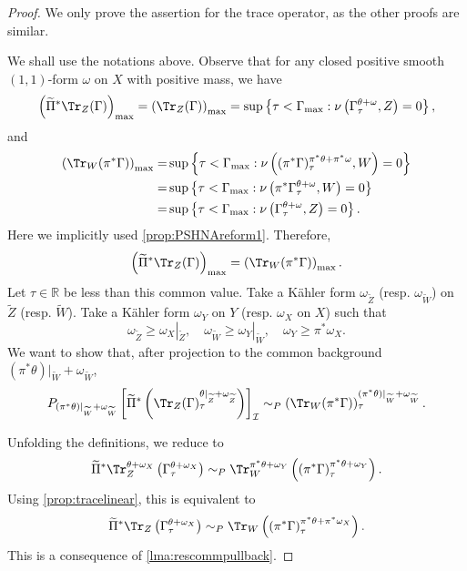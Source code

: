 \begin{proof}
We only prove the assertion for the trace operator, as the other proofs are similar.

We shall use the notations above. Observe that for any closed positive smooth $(1,1)$-form $\omega$ on $X$ with positive mass, we have
\[
\left(\widetilde{\Pi}^* \Tr_Z(\Gamma)\right)_{\max}=\left( \Tr_Z(\Gamma)\right)_{\max}=\sup\left\{ \tau<\Gamma_{\max}: \nu\left(\Gamma^{\theta+\omega}_{\tau},Z\right)=0 \right\},
\]
and
\[
\begin{aligned}
\left(\Tr_W(\pi^*\Gamma)\right)_{\max}=&\sup\left\{ \tau<\Gamma_{\max}: \nu\left((\pi^*\Gamma)^{\pi^*\theta+\pi^*\omega}_{\tau},W\right)=0 \right\}\\
=&\sup\left\{ \tau<\Gamma_{\max}: \nu\left(\pi^*\Gamma^{\theta+\omega}_{\tau},W\right)=0 \right\}\\
=& \sup\left\{ \tau<\Gamma_{\max}: \nu\left(\Gamma^{\theta+\omega}_{\tau},Z\right)=0 \right\}.
\end{aligned}
\]
Here we implicitly used \cref{prop:PSHNAreform1}.
Therefore,
\[
\left(\widetilde{\Pi}^* \Tr_Z(\Gamma)\right)_{\max}=\left(\Tr_W(\pi^*\Gamma)\right)_{\max}.
\]
Let $\tau\in \mathbb{R}$ be less than this common value. Take a K\"ahler form $\omega_{\widetilde{Z}}$ (resp. $\omega_{\widetilde{W}}$) on $\widetilde{Z}$ (resp. $\widetilde{W}$).
Take a K\"ahler form $\omega_Y$ on $Y$ (resp. $\omega_X$ on $X$) such that
\[
\omega_{\widetilde{Z}}\geq \omega_X|_{\widetilde{Z}},\quad \omega_{\widetilde{W}} \geq \omega_Y|_{\widetilde{W}},\quad \omega_Y \geq \pi^*\omega_X.
\]
We want to show that, after projection to the common background $(\pi^*\theta)|_{\widetilde{W}}+\omega_{\widetilde{W}}$,
\[
P_{(\pi^*\theta)|_{\widetilde{W}}+\omega_{\widetilde{W}}}\left[\widetilde{\Pi}^*\left(\Tr_Z(\Gamma)^{\theta|_{\widetilde{Z}}+\omega_{\widetilde{Z}}}_\tau\right)\right]_{\mathcal I} \sim_P
\left(\Tr_W(\pi^*\Gamma)\right)^{(\pi^*\theta)|_{\widetilde{W}}+\omega_{\widetilde{W}}}_\tau.
\]

Unfolding the definitions, we reduce to
\[
\widetilde{\Pi}^* \Tr_Z^{\theta+\omega_X}\left( \Gamma^{\theta+\omega_X}_{\tau} \right)\sim_P \Tr_{W}^{\pi^*\theta+\omega_Y}\left( \left( \pi^*\Gamma\right)^{\pi^*\theta+\omega_Y}_{\tau}\right).
\]
Using \cref{prop:tracelinear}, this is equivalent to
\[
\widetilde{\Pi}^* \Tr_Z\left( \Gamma^{\theta+\omega_X}_{\tau} \right)\sim_P \Tr_{W}\left( \left( \pi^*\Gamma\right)^{\pi^*\theta+\pi^*\omega_X}_{\tau}\right).
\]
This is a consequence of \cref{lma:rescommpullback}.
\end{proof}


